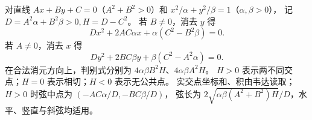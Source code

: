 对直线 $Ax+By+C=0$（$A^2+B^2>0$）和 $x^2/\alpha+y^2/\beta=1$（$\alpha,\beta>0$），
记 $D=A^2\alpha+B^2\beta>0,H=D-C^2$。
若 $B\ne0$，消去 $y$ 得
\[
 Dx^2+2AC\alpha x+\alpha(C^2-B^2\beta)=0.
\]
若 $A\ne0$，消去 $x$ 得
\[
 Dy^2+2BC\beta y+\beta(C^2-A^2\alpha)=0.
\]
在合法消元方向上，判别式分别为 $4\alpha\beta B^2H$、$4\alpha\beta A^2H$。
$H>0$ 表示两不同交点；$H=0$ 表示相切；$H<0$ 表示无公共点。
实交点坐标和、积由韦达读取；$H>0$ 时弦中点为 $(-AC\alpha/D,-BC\beta/D)$，
弦长为 $2\sqrt{\alpha\beta(A^2+B^2)H}/D$，水平、竖直与斜弦均适用。
